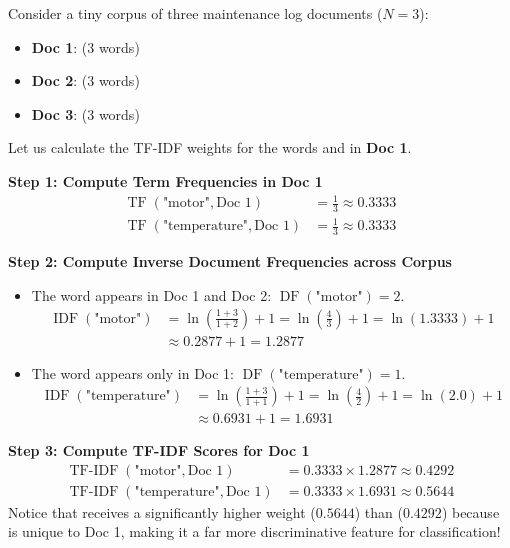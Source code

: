 \begin{example}
Consider a tiny corpus of three maintenance log documents ($N = 3$):
\begin{itemize}
    \item \textbf{Doc 1}:  (3 words)
    \item \textbf{Doc 2}:  (3 words)
    \item \textbf{Doc 3}:  (3 words)
\end{itemize}
Let us calculate the TF-IDF weights for the words  and  in \textbf{Doc 1}.

\textbf{Step 1: Compute Term Frequencies in Doc 1}
\begin{align*}
\operatorname{TF}(\text{"motor"}, \text{Doc 1}) &= \frac{1}{3} \approx 0.3333 \\
\operatorname{TF}(\text{"temperature"}, \text{Doc 1}) &= \frac{1}{3} \approx 0.3333
\end{align*}

\textbf{Step 2: Compute Inverse Document Frequencies across Corpus}
\begin{itemize}
    \item The word  appears in Doc 1 and Doc 2: $\operatorname{DF}(\text{"motor"}) = 2$.
    \begin{align*}
    \operatorname{IDF}(\text{"motor"}) &= \ln\left(\frac{1 + 3}{1 + 2}\right) + 1 = \ln\left(\frac{4}{3}\right) + 1 = \ln(1.3333) + 1 \\
                                      &\approx 0.2877 + 1 = \mathbf{1.2877}
    \end{align*}
    \item The word  appears only in Doc 1: $\operatorname{DF}(\text{"temperature"}) = 1$.
    \begin{align*}
    \operatorname{IDF}(\text{"temperature"}) &= \ln\left(\frac{1 + 3}{1 + 1}\right) + 1 = \ln\left(\frac{4}{2}\right) + 1 = \ln(2.0) + 1 \\
                                            &\approx 0.6931 + 1 = \mathbf{1.6931}
    \end{align*}
\end{itemize}

\textbf{Step 3: Compute TF-IDF Scores for Doc 1}
\begin{align*}
\operatorname{TF-IDF}(\text{"motor"}, \text{Doc 1}) &= 0.3333 \times 1.2877 \approx \mathbf{0.4292} \\
\operatorname{TF-IDF}(\text{"temperature"}, \text{Doc 1}) &= 0.3333 \times 1.6931 \approx \mathbf{0.5644}
\end{align*}
Notice that  receives a significantly higher weight ($0.5644$) than  ($0.4292$) because  is unique to Doc 1, making it a far more discriminative feature for classification!
\end{example}

